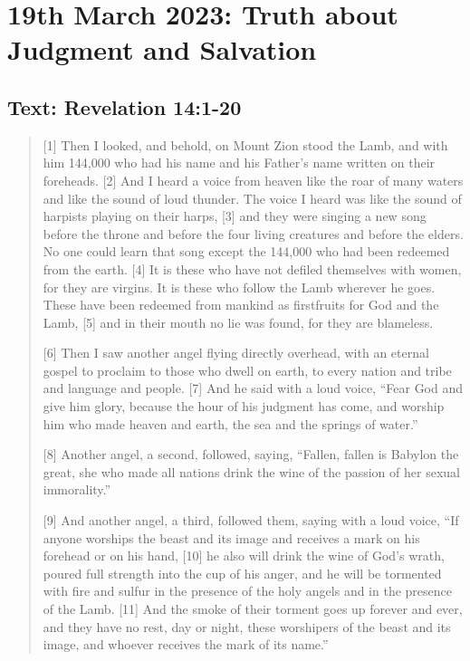 \section{19th March 2023: Truth about Judgment and Salvation}
\subsection*{Text: Revelation 14:1-20}
  \begin{quote}
    [1] Then I looked, and behold, on Mount Zion stood the Lamb, and with him
    144,000 who had his name and his Father’s name written on their
    foreheads.  [2] And I heard a voice from heaven like the roar of many
    waters and like the sound of loud thunder.  The voice I heard was like
    the sound of harpists playing on their harps, [3] and they were singing a
    new song before the throne and before the four living creatures and
    before the elders.  No one could learn that song except the 144,000 who
    had been redeemed from the earth.  [4] It is these who have not defiled
    themselves with women, for they are virgins.  It is these who follow the
    Lamb wherever he goes.  These have been redeemed from mankind as
    firstfruits for God and the Lamb, [5] and in their mouth no lie was
    found, for they are blameless.

    [6] Then I saw another angel flying directly overhead, with an eternal
    gospel to proclaim to those who dwell on earth, to every nation and tribe
    and language and people.  [7] And he said with a loud voice, “Fear God
    and give him glory, because the hour of his judgment has come, and
    worship him who made heaven and earth, the sea and the springs of water.”

    [8] Another angel, a second, followed, saying, “Fallen, fallen is Babylon
    the great, she who made all nations drink the wine of the passion of her
    sexual immorality.”

    [9] And another angel, a third, followed them, saying with a loud voice,
    “If anyone worships the beast and its image and receives a mark on his
    forehead or on his hand, [10] he also will drink the wine of God’s wrath,
    poured full strength into the cup of his anger, and he will be tormented
    with fire and sulfur in the presence of the holy angels and in the
    presence of the Lamb.  [11] And the smoke of their torment goes up
    forever and ever, and they have no rest, day or night, these worshipers
    of the beast and its image, and whoever receives the mark of its name.”


\end{quote}
